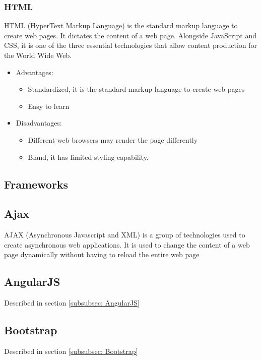 \documentclass[12pt, letterpaper, twoside]{article}
\begin{document}
			\subsubsection{HTML} %
				HTML (HyperText Markup Language) is the standard markup language to create web pages. It dictates the content of a web page. Alongside JavaScript and CSS, it is one of the three essential technologies that allow content production for the World Wide Web.
				\begin{itemize}
					\item Advantages:
						\begin{itemize}
							\item Standardized, it is the standard markup language to create web pages
							\item Easy to learn
						\end{itemize}
					\item Disadvantages:
						\begin{itemize}
							\item Different web browsers may render the page differently
							\item Bland, it has limited styling capability.
						\end{itemize}
				\end{itemize}

		
	\subsection{Frameworks}
		\subsection{Ajax}
			AJAX (Asynchronous Javascript and XML) is a group of technologies used to create asynchronous web applications. It is used to change the content of a web page dynamically without having to reload the entire web page
			
		\subsection{AngularJS}
			Described in section \ref{subsubsec: AngularJS}
			
		\subsection{Bootstrap}
			Described in section \ref{subsubsec: Bootstrap}
			
\end{document}
